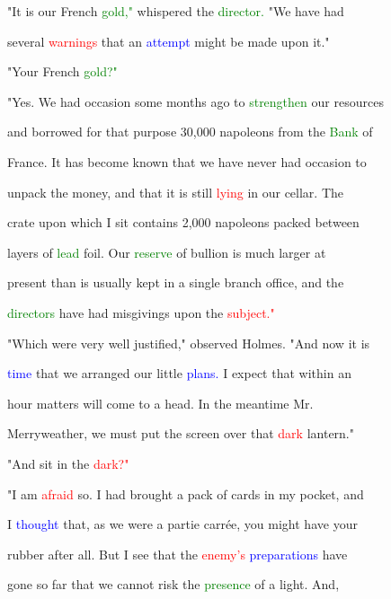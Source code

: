  "It is our French \textcolor{green}{gold,"} whispered the \textcolor{green}{director.} "We have had

 several \textcolor{red}{warnings} that an \textcolor{blue}{attempt} might be made upon it."



 "Your French \textcolor{green}{gold?"}



 "Yes. We had occasion some months ago to \textcolor{green}{strengthen} our resources

 and borrowed for that purpose 30,000 napoleons from the \textcolor{green}{Bank} of

 France. It has become known that we have never had occasion to

 unpack the \textcolor{BurntOrange}{money,} and that it is still \textcolor{red}{lying} in our cellar. The

 crate upon which I sit contains 2,000 napoleons packed between

 layers of \textcolor{green}{lead} foil. Our \textcolor{green}{reserve} of bullion is much larger at

 \textcolor{BurntOrange}{present} than is usually kept in a single branch office, and the

 \textcolor{green}{directors} have had misgivings upon the \textcolor{red}{subject."}



 "Which were very well justified," observed Holmes. "And now it is

 \textcolor{blue}{time} that we arranged our little \textcolor{blue}{plans.} I \textcolor{BurntOrange}{expect} that within an

 hour matters will come to a head. In the meantime Mr.

 Merryweather, we must put the screen over that \textcolor{red}{dark} lantern."



 "And sit in the \textcolor{red}{dark?"}



 "I am \textcolor{red}{afraid} so. I had brought a pack of cards in my pocket, and

 I \textcolor{blue}{thought} that, as we were a partie carrée, you might have your

 rubber after all. But I see that the \textcolor{red}{enemy's} \textcolor{blue}{preparations} have

 gone so far that we cannot \textcolor{BurntOrange}{risk} the \textcolor{green}{presence} of a light. And,


